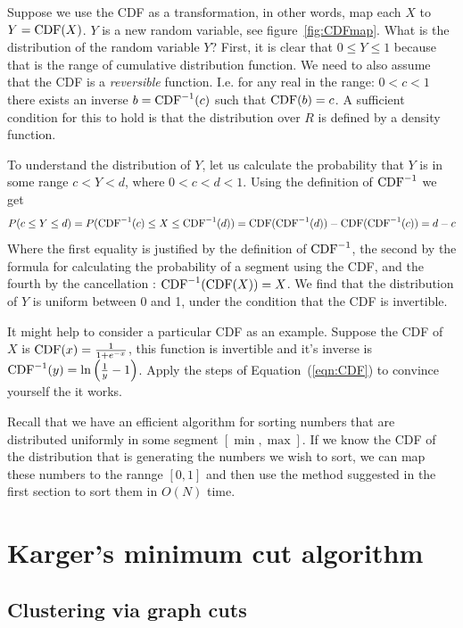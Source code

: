 Suppose we use the CDF as a transformation, in other words, map each
$X$ to $Y=\mbox{CDF}(X)$. $Y$ is a new random variable, see
figure~\ref{fig:CDFmap}. What is the distribution of the random
variable $Y$? First, it is clear that $0 \leq Y \leq 1$ because that
is the range of cumulative distribution function. We need to also
assume that the CDF is a {\em reversible} function. I.e. for any real
in the range: $0<c<1$ there exists an inverse $b=\mbox{CDF}^{-1}(c)$ such
that $\mbox{CDF}(b)=c$. A sufficient condition for this to hold is that the
distribution over $R$ is defined by a density function.

To understand the distribution of $Y$, let us calculate the
probability that $Y$ is in some range $c<Y<d$, where $0<c<d<1$.
Using the definition of $\mbox{CDF}^{-1}$ we get
\begin{equation} \label{eqn:CDF}
P(c \leq Y \leq d) = P(\mbox{CDF}^{-1}(c) \leq X \leq \mbox{CDF}^{-1}(d)) =
\mbox{CDF}(\mbox{CDF}^{-1}(d))-\mbox{CDF}(\mbox{CDF}^{-1}(c)) = d-c
\end{equation}
Where the first equality is justified by the definition of
$\mbox{CDF}^{-1}$, the second by the formula for calculating the probability
of a segment using the CDF, and the fourth by the cancellation :
$\mbox{CDF}^{-1}(\mbox{CDF}(X))=X$.  We find that the distribution of $Y$ is
uniform between 0 and 1, under the condition that the CDF is invertible.

It might help to consider a particular CDF as an example. Suppose the
CDF of $X$ is $\mbox{CDF}(x) = \frac{1}{1+e^{-x}}$, this function is
invertible and it's inverse is
$\mbox{CDF}^{-1}(y)=\ln\left(\frac{1}{y}-1\right)$. Apply the steps of
Equation~(\ref{eqn:CDF}) to convince yourself the it works.

Recall that we have an efficient algorithm for sorting numbers that
are distributed uniformly in some segment $[\min,\max]$.
If we know the CDF of the distribution that is generating the
numbers we wish to sort, we can map these numbers to the rannge
$[0,1]$ and then use the method suggested in the first section to sort
them in $O(N)$ time.

\section{Karger's minimum cut algorithm}

\subsection{Clustering via graph cuts}

